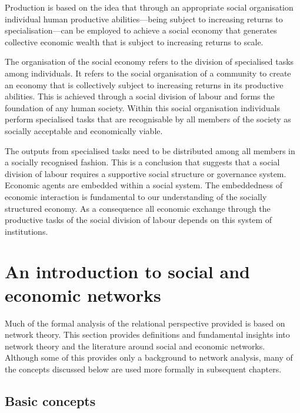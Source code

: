 \begin{hypothesis} \label{hyp:socialorganisationproduction}
Production is based on the idea that through an appropriate social organisation individual human productive abilities---being subject to increasing returns to specialisation---can be employed to achieve a social economy that generates collective economic wealth that is subject to increasing returns to scale.
\end{hypothesis}

The organisation of the social economy refers to the division of specialised tasks among individuals. It refers to the social organisation of a community to create an economy that is collectively subject to increasing returns in its productive abilities. This is achieved through a social division of labour and forms the foundation of any human society. Within this social organisation individuals perform specialised tasks that are recognisable by all members of the society as socially acceptable and economically viable.

The outputs from specialised tasks need to be distributed among all members in a socially recognised fashion. This is a conclusion that suggests that a social division of labour requires a supportive social structure or governance system. Economic agents are embedded within a social system. The embeddedness of economic interaction is fundamental to our understanding of the socially structured economy. As a consequence all economic exchange through the productive tasks of the social division of labour depends on this system of institutions. 

\section{An introduction to social and economic networks}
\label{sec:socialeconomicnetworks}

Much of the formal analysis of the relational perspective provided is based on network theory. This section provides definitions and fundamental insights into network theory and the literature around social and economic networks. Although some of this provides only a background to network analysis, many of the concepts discussed below are used more formally in subsequent chapters.

\subsection{Basic concepts}

